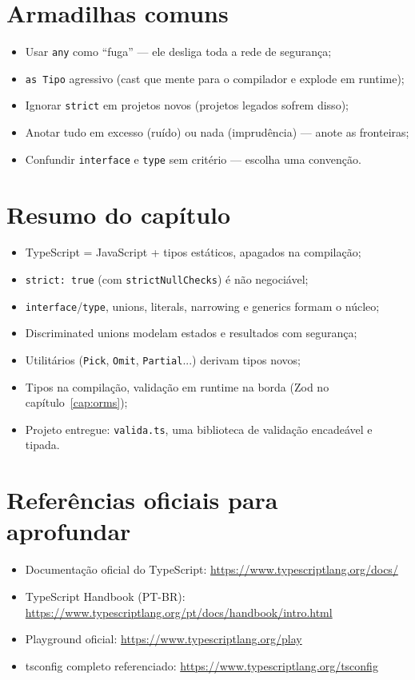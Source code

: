 \section{Armadilhas comuns}

\begin{itemize}[leftmargin=*, itemsep=0.4em]
  \item Usar \texttt{any} como ``fuga'' — ele desliga toda a rede de segurança;
  \item \texttt{as Tipo} agressivo (cast que mente para o compilador e explode em runtime);
  \item Ignorar \texttt{strict} em projetos novos (projetos legados sofrem disso);
  \item Anotar tudo em excesso (ruído) ou nada (imprudência) — anote as fronteiras;
  \item Confundir \texttt{interface} e \texttt{type} sem critério — escolha uma convenção.
\end{itemize}

\section{Resumo do capítulo}

\begin{itemize}[leftmargin=*, itemsep=0.3em]
  \item TypeScript = JavaScript + tipos estáticos, apagados na compilação;
  \item \texttt{strict: true} (com \texttt{strictNullChecks}) é não negociável;
  \item \texttt{interface}/\texttt{type}, unions, literals, narrowing e generics formam o núcleo;
  \item Discriminated unions modelam estados e resultados com segurança;
  \item Utilitários (\texttt{Pick}, \texttt{Omit}, \texttt{Partial}...) derivam tipos novos;
  \item Tipos na compilação, validação em runtime na borda (Zod no capítulo~\ref{cap:orms});
  \item Projeto entregue: \texttt{valida.ts}, uma biblioteca de validação encadeável e tipada.
\end{itemize}

\section{Referências oficiais para aprofundar}

\begin{itemize}[leftmargin=*, itemsep=0.3em]
  \item Documentação oficial do TypeScript: \url{https://www.typescriptlang.org/docs/}
  \item TypeScript Handbook (PT-BR): \url{https://www.typescriptlang.org/pt/docs/handbook/intro.html}
  \item Playground oficial: \url{https://www.typescriptlang.org/play}
  \item tsconfig completo referenciado: \url{https://www.typescriptlang.org/tsconfig}
\end{itemize}
